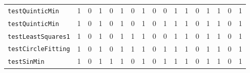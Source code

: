 \documentclass[twoside,a4paper,11pt]{memoir}
\begin{document}
\begin{table}[]
\begin{adjustbox}{center}
\begin{tabular}{l|cccccccccccccccc}
    \texttt{testQuinticMin} & 1 & 0 & 1 & 0 & 1 & 0 & 1 & 0 & 0 & 1 & 1 & 0 & 1 & 1 & 0 & 1 \\
    \texttt{testQuinticMin} & 1 & 0 & 1 & 0 & 1 & 0 & 1 & 0 & 1 & 1 & 1 & 0 & 1 & 1 & 0 & 1 \\
    \texttt{testLeastSquares1} & 1 & 0 & 1 & 0 & 1 & 1 & 1 & 0 & 0 & 1 & 1 & 0 & 1 & 1 & 0 & 1 \\
    \texttt{testCircleFitting} & 1 & 0 & 1 & 0 & 1 & 1 & 1 & 0 & 1 & 1 & 1 & 0 & 1 & 1 & 0 & 1 \\
    \texttt{testSinMin} & 1 & 0 & 1 & 1 & 1 & 0 & 1 & 0 & 1 & 1 & 1 & 0 & 1 & 1 & 0 & 1 \\
    \end{tabular}
    \end{adjustbox}
\end{table}
\end{document}
